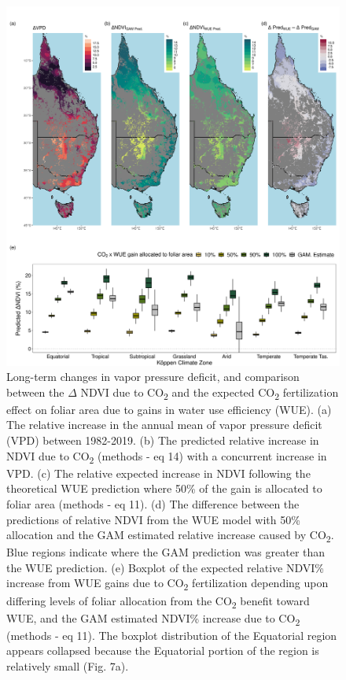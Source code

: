 \documentclass[gc, manuscript]{copernicus}
\begin{document}
\clearpage
\begin{figure}
\includegraphics[width=14cm]{../../figures/Fig7_map_dVpd_gamCO2Pred_wueCO2Pred_dDifferenceBoxplot} \caption{Long-term changes in vapor pressure deficit, and comparison between the $\Delta$ NDVI due to CO\textsubscript{2} and the expected CO\textsubscript{2} fertilization effect on foliar area due to gains in water use efficiency (WUE). (a) The relative increase in the annual mean of vapor pressure deficit (VPD) between 1982-2019. (b) The predicted relative increase in NDVI due to CO\textsubscript{2} (methods - eq 14) with a concurrent increase in VPD. (c) The relative expected increase in NDVI following the theoretical WUE prediction where 50\% of the gain is allocated to foliar area (methods - eq 11). (d) The difference between the predictions of relative NDVI from the WUE model with 50\% allocation and the GAM estimated relative increase caused by CO\textsubscript{2}. Blue regions indicate where the GAM prediction was greater than the WUE prediction. (e) Boxplot of the expected relative NDVI\% increase from WUE gains due to CO\textsubscript{2} fertilization depending upon differing levels of foliar allocation from the CO\textsubscript{2} benefit toward WUE, and the GAM estimated NDVI\% increase due to CO\textsubscript{2} (methods - eq 11). The boxplot distribution of the Equatorial region appears collapsed because the Equatorial portion of the region is relatively small (Fig. 7a).}\label{fig:unnamed-chunk-6}
\end{figure}
\clearpage
\end{document}
